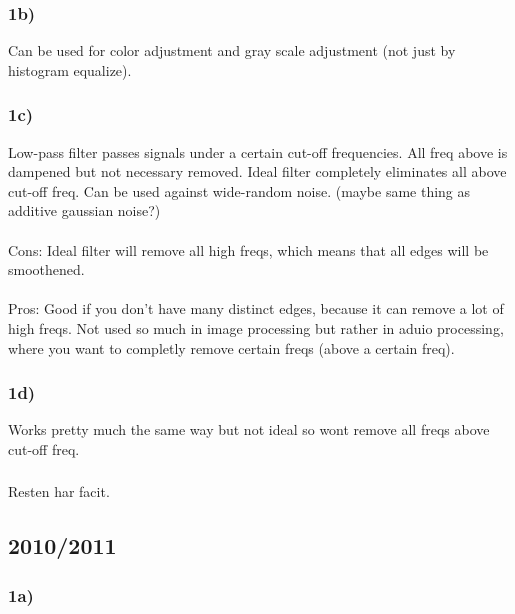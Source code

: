 \documentclass[12pt]{article}
\begin{document}
     \subsubsection*{1b)}
     
        Can be used for color adjustment and gray scale adjustment (not just by histogram equalize).
        
    \subsubsection*{1c)}
    
        Low-pass filter passes signals under a certain cut-off frequencies. All freq above is dampened but not necessary removed. 
        Ideal filter completely eliminates all above cut-off freq. Can be used against wide-random noise. (maybe same thing as additive
        gaussian noise?)\\
        \\
        Cons: Ideal filter will remove all high freqs, which means that all edges will be smoothened.\\
        \\
        Pros: Good if you don't have many distinct edges, because it can remove a lot of high freqs. 
        Not used so much in image processing but rather in aduio processing, where you want to completly 
        remove certain freqs (above a certain freq).
        
    \subsubsection*{1d)}
    
        Works pretty much the same way but not ideal so wont remove all freqs above cut-off freq.
        
    \subsubsection*{}
    
        Resten har facit.
        
\subsection{2010/2011}

    \subsubsection*{1a)}
        
\end{document}
